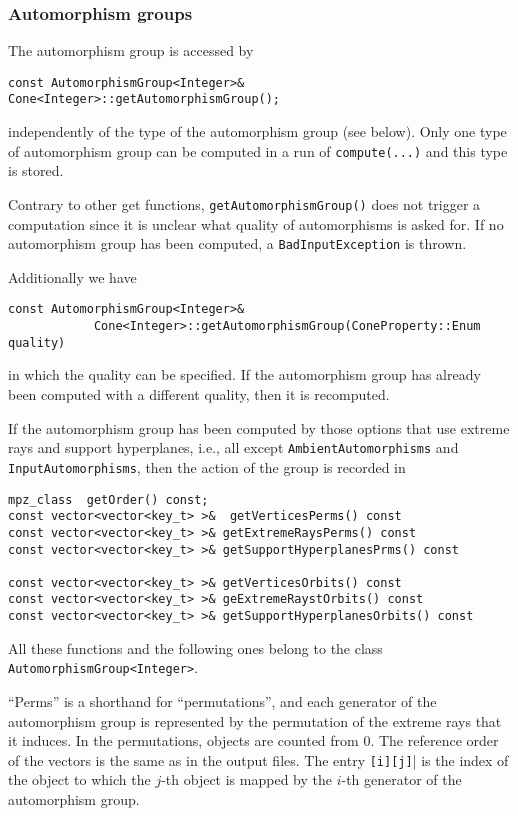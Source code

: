 \begin{small}
\subsubsection{Automorphism groups}

The automorphism group is accessed by

\begin{Verbatim}
const AutomorphismGroup<Integer>& Cone<Integer>::getAutomorphismGroup();
\end{Verbatim}
independently of the type of the automorphism group (see below). Only one type of automorphism group can be computed in a run of \verb|compute(...)| and this type is stored.

Contrary to other get functions, \verb|getAutomorphismGroup()| does not trigger a computation since it is unclear what quality of automorphisms is asked for. If no automorphism group has been computed, a \verb|BadInputException| is thrown.

Additionally we have
\begin{Verbatim}
const AutomorphismGroup<Integer>& 
            Cone<Integer>::getAutomorphismGroup(ConeProperty::Enum quality)
\end{Verbatim}
in which the quality can be specified. If the automorphism group has already been computed with a different quality, then it is recomputed.

If the automorphism group has been computed by those options that use extreme rays and support hyperplanes, i.e., all except \verb|AmbientAutomorphisms| and \verb|InputAutomorphisms|, then the action of the group is recorded in
\begin{Verbatim}
mpz_class  getOrder() const;
const vector<vector<key_t> >&  getVerticesPerms() const
const vector<vector<key_t> >& getExtremeRaysPerms() const
const vector<vector<key_t> >& getSupportHyperplanesPrms() const

const vector<vector<key_t> >& getVerticesOrbits() const
const vector<vector<key_t> >& geExtremeRaystOrbits() const
const vector<vector<key_t> >& getSupportHyperplanesOrbits() const
\end{Verbatim}
All these functions and the following ones belong to the class \verb|AutomorphismGroup<Integer>|.

``Perms'' is a shorthand for ``permutations'', and each generator of the automorphism group is represented by the permutation of the extreme rays that it induces. In the permutations, objects are counted from $0$. The reference order of the vectors is the same as in the output files. The entry \verb|[i][j]|| is the index of the object to which the $j$-th object is mapped by the $i$-th generator of the automorphism group.


\end{small}
